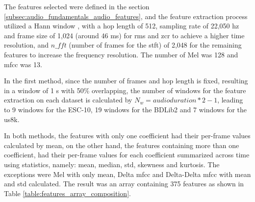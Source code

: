 The features selected were defined in the section \ref{subsec:audio_fundamentals_audio_features}, and the feature extraction process utilized a Hann window \cite{Blackmann1958}, with a hop length of 512, sampling rate of 22,050 \gls{hz} and frame size of 1,024 (around 46 ms) for \gls{rms} and \gls{zcr} to achieve a higher time resolution, and $n\_fft$ (number of frames for the \gls{stft}) of 2,048 for the remaining features to increase the frequency resolution. The number of Mel was 128 and \gls{mfcc} was 13.

In the first method, since the number of frames and hop length is fixed, resulting in a window of 1 \gls{s} with 50\% overlapping, the number of windows for the feature extraction on each dataset is calculated by $N_w = audioduration * 2 -1$, leading to 9 windows for the ESC-10, 19 windows for the BDLib2 and 7 windows for the \gls{us8k}.

In both methods, the features with only one coefficient had their per-frame values calculated by mean, on the other hand, the features containing more than one coefficient, had their per-frame values for each coefficient summarized across time using statistics, namely: mean, median, \gls{std}, skewness and kurtosis. The exceptions were Mel with only mean, Delta \gls{mfcc} and Delta-Delta \gls{mfcc} with mean and \gls{std} calculated.  The result was an array containing 375 features as shown in Table \ref{table:features_array_composition}.

